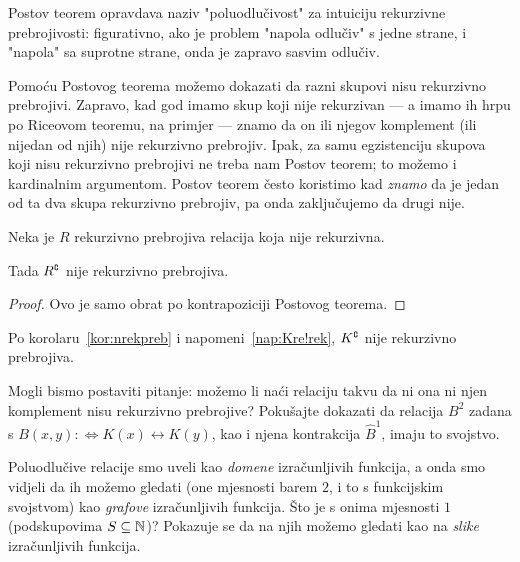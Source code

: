 Postov teorem opravdava naziv "poluodlučivost" za intuiciju rekurzivne prebrojivosti: figurativno, ako je problem "napola odlučiv" s jedne strane, i "napola" sa suprotne strane, onda je zapravo sasvim odlučiv.

Pomoću Postovog teorema možemo dokazati da razni skupovi nisu rekurzivno prebrojivi. Zapravo, kad god imamo skup koji nije rekurzivan --- a imamo ih hrpu po Riceovom teoremu, na primjer --- znamo da on ili njegov komplement (ili nijedan od njih) nije rekurzivno prebrojiv.
Ipak, za samu egzistenciju skupova koji nisu rekurzivno prebrojivi ne treba nam Postov teorem; to možemo i kardinalnim argumentom.
Postov teorem često koristimo kad \emph{znamo} da je jedan od ta dva skupa rekurzivno prebrojiv, pa onda zaključujemo da drugi nije.

\begin{korolar}[{name=[kriterij za negaciju rekurzivne prebrojivosti]}]\label{kor:nrekpreb}
Neka je $R$ rekurzivno prebrojiva relacija koja nije rekurzivna.

    Tada $R\sp{{\scriptscriptstyle\complement}}$ nije rekurzivno prebrojiva.
\end{korolar}
\begin{proof}
Ovo je samo obrat po kontrapoziciji Postovog teorema.
\end{proof}

\begin{primjer}[{name=[komplement Kleenejevog skupa nije rekurzivno prebrojiv]}]
    Po korolaru~\ref{kor:nrekpreb} i napomeni~\ref{nap:Kre!rek}, $K\sp{{\scriptscriptstyle\complement}}$ nije rekurzivno prebrojiva.
\end{primjer}

Mogli bismo postaviti pitanje: možemo li naći relaciju takvu da ni ona ni njen komplement nisu rekurzivno prebrojive? Pokušajte dokazati da relacija $B^2$ zadana s $B(x,y):\Longleftrightarrow K(x)\leftrightarrow K(y)$, kao i njena kontrakcija $\hat B^1$, imaju to svojstvo.


Poluodlučive relacije smo uveli kao \emph{domene} izračunljivih funkcija, a onda smo vidjeli da ih možemo gledati (one mjesnosti barem $2$, i to s funkcijskim svojstvom) kao \emph{grafove} izračunljivih funkcija. Što je s onima mjesnosti $1$ (podskupovima $S\subseteq{\mathbb N}$)? Pokazuje se da na njih možemo gledati kao na \emph{slike} izračunljivih funkcija.

